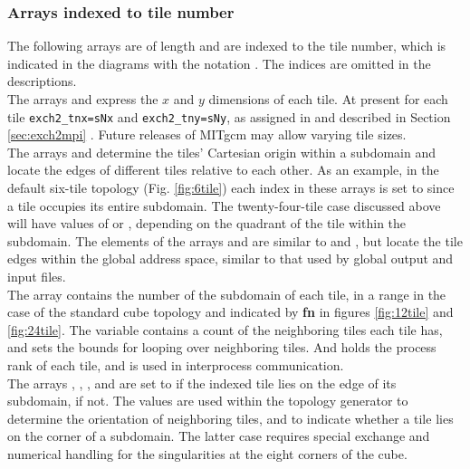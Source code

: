 \subsubsection{Arrays indexed to tile number}

The following arrays are of length  and are indexed to
the tile number, which is indicated in the diagrams with the notation
.  The indices are omitted in the descriptions. \\

The arrays  and
 express the $x$ and $y$ dimensions of
each tile.  At present for each tile \texttt{exch2\_tnx=sNx} and
\texttt{exch2\_tny=sNy}, as assigned in  and described in
Section \ref{sec:exch2mpi} .  Future releases of MITgcm may allow varying tile
sizes. \\

The arrays  and
 determine the tiles' 
Cartesian origin within a subdomain  
and locate the edges of different tiles relative to each other.  As
an example, in the default six-tile topology (Fig. \ref{fig:6tile})
each index in these arrays is set to  since a tile occupies
its entire subdomain.  The twenty-four-tile case discussed above will
have values of  or , depending on the quadrant of the
tile within the subdomain.  The elements of the arrays
 and
 are similar to
 and
, but locate the tile edges within the
global address space, similar to that used by global output and input
files. \\

The array  contains the number of
the subdomain of each tile, in a range  in the case of the
standard cube topology and indicated by \textbf{\textsf{fn}} in
figures \ref{fig:12tile} and \ref{fig:24tile}. The
 variable contains a
count of the neighboring tiles each tile has, and sets the bounds for
looping over neighboring tiles.  And
 holds the process rank of each
tile, and is used in interprocess communication.  \\


The arrays ,
,
, and
 are set to  if the
indexed tile lies on the edge of its subdomain,  if
not.  The values are used within the topology generator to determine
the orientation of neighboring tiles, and to indicate whether a tile
lies on the corner of a subdomain.  The latter case requires special
exchange and numerical handling for the singularities at the eight
corners of the cube. \\


